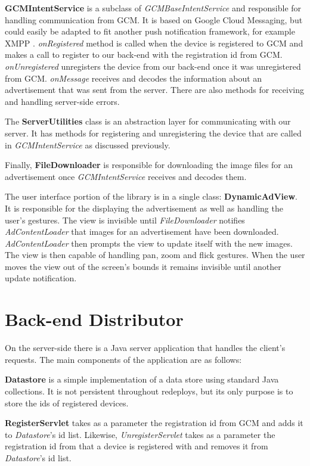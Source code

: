 \textbf{GCMIntentService} is a subclass of \textit{GCMBaseIntentService} and responsible for handling communication from GCM. It is based on Google Cloud Messaging, but could easily be adapted to fit another push notification framework, for example XMPP \cite{flores2013cloudmessaging}. \textit{onRegistered} method is called when the device is registered to GCM and makes a call to register to our back-end with the registration id from GCM. \textit{onUnregistered} unregisters the device from our back-end once it was unregistered from GCM. \textit{onMessage} receives and decodes the information about an advertisement that was sent from the server. There are also methods for receiving and handling server-side errors.

The \textbf{ServerUtilities} class is an abstraction layer for communicating with our server. It has methods for registering and unregistering the device that are called in \textit{GCMIntentService} as discussed previously.

Finally, \textbf{FileDownloader} is responsible for downloading the image files for an advertisement once \textit{GCMIntentService} receives and decodes them.

The user interface portion of the library is in a single class: \textbf{DynamicAdView}. It is responsible for the displaying the advertisement as well as handling the user's gestures. The view is invisible until \textit{FileDownloader} notifies \textit{AdContentLoader} that images for an advertisement have been downloaded. \textit{AdContentLoader} then prompts the view to update itself with the new images. The view is then capable of handling pan, zoom and flick gestures. When the user moves the view out of the screen's bounds it remains invisible until another update notification.

\section{Back-end Distributor}

On the server-side there is a Java server application that handles the client's requests. The main components of the application are as follows:

\textbf{Datastore} is a simple implementation of a data store using standard Java collections. It is not persistent throughout redeploys, but its only purpose is to store the ids of registered devices.

\textbf{RegisterServlet} takes as a parameter the registration id from GCM and adds it to \textit{Datastore}'s id list. Likewise, \textit{UnregisterServlet} takes as a parameter the registration id from that a device is registered with and removes it from \textit{Datastore}'s id list.

